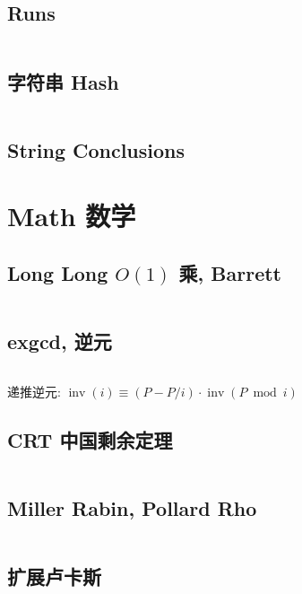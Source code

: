 \documentclass[titlepage, a4paper]{article}
\begin{document}
\begin{multicols}{2}
\begin{spacing}{0.6}
				\subsection{Runs}
					\inputminted{cpp}{src/String/Runs.cpp}
				\subsection{字符串 Hash}
				\texttt{}
				\inputminted{cpp}{src/String/hash.cpp}	
				\subsection{String Conclusions}
					
			\newpage
			\section{Math 数学}
				\subsection{Long Long $O(1)$ 乘, Barrett}
					\inputminted{cpp}{src/Miscellany/LLFPM.cpp}
				\subsection{exgcd, 逆元}
					
					\inputminted{cpp}{src/Math/exgcd.cpp}
					递推逆元: $\operatorname{inv}(i) \equiv (P - P / i) \cdot \operatorname{inv}(P \bmod i)$
				\subsection{CRT 中国剩余定理}
					\inputminted{cpp}{src/Math/CRT_lbn.cpp}
				\subsection{Miller Rabin, Pollard Rho}
					\inputminted{cpp}{src/Math/Miller Rabin And Pollard Rho.cpp}
				\subsection{扩展卢卡斯}
					\inputminted{cpp}{src/Math/扩展卢卡斯.cpp}

\end{spacing}
\end{multicols}
\end{document}
